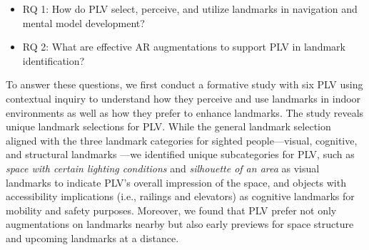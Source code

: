 \begin{itemize}
    \item  RQ 1:  How do PLV select, perceive, and utilize landmarks in navigation and mental model development?
    \item RQ 2: What are effective AR augmentations to support PLV in landmark identification?
\end{itemize}





To answer these questions, we first conduct a formative study with six PLV using contextual inquiry to understand how they perceive and use landmarks in indoor environments as well as how they prefer to enhance landmarks. %
The study reveals unique landmark selections for PLV. While the general landmark selection aligned with the three landmark categories for sighted people---visual, cognitive, and structural landmarks \cite{sorrows1999nature}---we identified unique subcategories for PLV, such as \textit{space with certain lighting conditions} and \textit{silhouette of an area} as visual landmarks to indicate PLV's overall impression of the space, and objects with accessibility implications (i.e., railings and elevators) as cognitive landmarks for mobility and safety purposes. Moreover, we found that PLV prefer not only augmentations on landmarks nearby but also early previews for space structure and upcoming landmarks at a distance.

